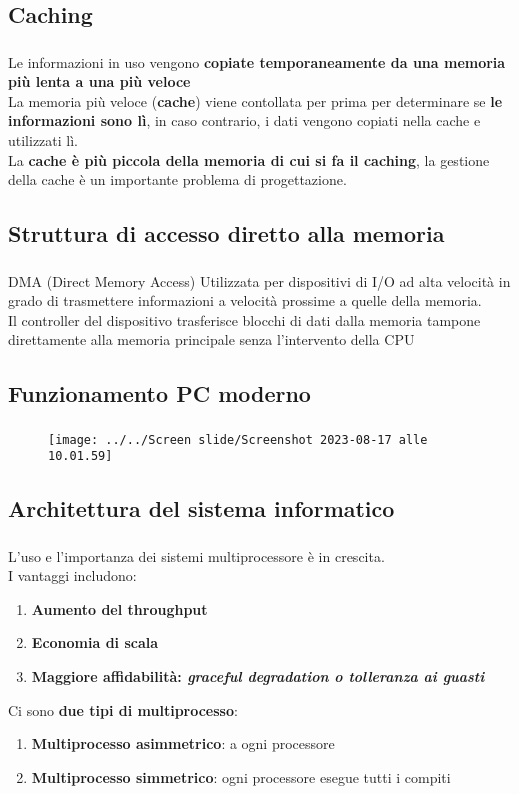 \documentclass{beamer}
\newenvironment{mainframe}{
	\begin{frame}
		\frametitle{\insertsubsection}
		\framesubtitle{\insertsection}
	}{
	\end{frame}
}
\begin{document}
\subsection{Caching}
\begin{mainframe}
	Le informazioni in uso vengono \textbf{copiate temporaneamente da una memoria più lenta a una più veloce}\\
	La memoria più veloce (\textbf{cache}) viene contollata per prima per determinare se \textbf{le informazioni sono lì}, in caso contrario, i dati vengono copiati nella cache e utilizzati lì.\\
	La \textbf{cache è più piccola della memoria di cui si fa il caching}, la gestione della cache è un importante problema di progettazione.
\end{mainframe}
\subsection{Struttura di accesso diretto alla memoria}
\begin{mainframe}
	\begin{block}{DMA (Direct Memory Access)}
		Utilizzata per dispositivi di I/O ad alta velocità in grado di trasmettere informazioni a velocità prossime a quelle della memoria.\\
		Il controller del dispositivo trasferisce blocchi di dati dalla memoria tampone direttamente alla memoria principale senza l'intervento della CPU
	\end{block}
\end{mainframe}
\subsection{Funzionamento PC moderno}
\begin{mainframe}
	\begin{figure}[h!]
		\centering
		\texttt{[image: ../../Screen slide/Screenshot 2023-08-17 alle 10.01.59]}
	\end{figure}
\end{mainframe}
\subsection{Architettura del sistema informatico}
\begin{mainframe}
	L'uso e l'importanza dei sistemi multiprocessore è in crescita.\\
	I vantaggi includono:
	\begin{enumerate}
		\item \textbf{Aumento del throughput}
		\item \textbf{Economia di scala}
		\item \textbf{Maggiore affidabilità: \textit{graceful degradation o tolleranza ai guasti}}
	\end{enumerate}
	Ci sono \textbf{due tipi di \textbf{multiprocesso}}:
	\begin{enumerate}
		\item \textbf{Multiprocesso asimmetrico}: a ogni processore 
		\item \textbf{Multiprocesso simmetrico}: ogni processore esegue tutti i compiti
	\end{enumerate}
\end{mainframe}
\end{document}
